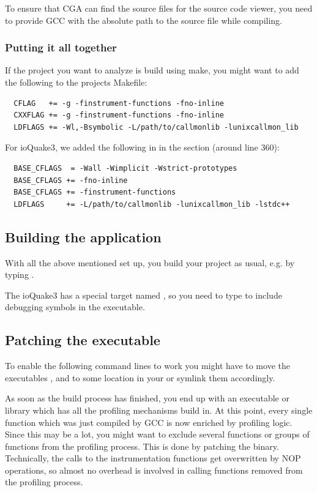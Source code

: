 To ensure that CGA can find the source files for the source code viewer, you need to provide GCC with the absolute path to the source file while compiling.

\subsubsection{Putting it all together} If the project you want to analyze is build using make, you might want to add the following to the projects Makefile:

\begin{verbatim}
  CFLAG   += -g -finstrument-functions -fno-inline 
  CXXFLAG += -g -finstrument-functions -fno-inline 
  LDFLAGS += -Wl,-Bsymbolic -L/path/to/callmonlib -lunixcallmon_lib
\end{verbatim}

For ioQuake3, we added the following in  in the  section (around line 360):

\begin{verbatim}
  BASE_CFLAGS  = -Wall -Wimplicit -Wstrict-prototypes
  BASE_CFLAGS += -fno-inline
  BASE_CFLAGS += -finstrument-functions 
  LDFLAGS     += -L/path/to/callmonlib -lunixcallmon_lib -lstdc++
\end{verbatim}

\subsection{Building the application} With all the above mentioned set up, you build your project as usual, e.g. by typing .

The ioQuake3 has a special target named , so you need to type  to include debugging symbols in the executable.

\subsection{Patching the executable} To enable the following command lines to work you might have to move the executables  ,  and  to some location in your  or symlink them accordingly.

As soon as the build process has finished, you end up with an executable or library which has all the profiling mechanisms build in. At this point, every single function which was just compiled by GCC is now enriched by profiling logic. Since this may be a lot, you might want to exclude several functions or groups of functions from the profiling process. This is done by patching the binary. Technically, the calls to the instrumentation functions get overwritten by NOP operations, so almost no overhead is involved in calling functions removed from the profiling process.

